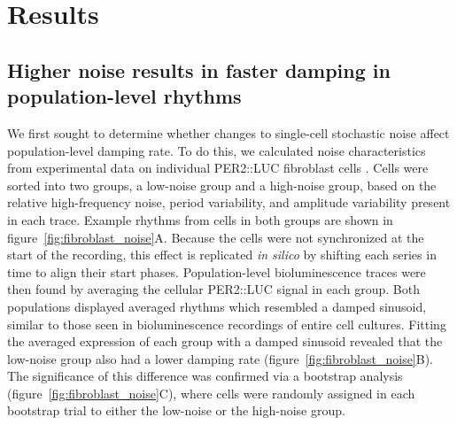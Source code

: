 \section{Results}

\subsection{Higher noise results in faster damping in population-level rhythms}

We first sought to determine whether changes to single-cell stochastic noise affect population-level damping rate.
To do this, we calculated noise characteristics from experimental data on individual PER2::LUC fibroblast cells \cite{Leise2012}.
Cells were sorted into two groups, a low-noise group and a high-noise group, based on the relative high-frequency noise, period variability, and amplitude variability present in each trace.
Example rhythms from cells in both groups are shown in figure~\ref{fig:fibroblast_noise}A.
Because the cells were not synchronized at the start of the recording, this effect is replicated {\itshape in silico} by shifting each series in time to align their start phases.
Population-level bioluminescence traces were then found by averaging the cellular PER2::LUC signal in each group.
Both populations displayed averaged rhythms which resembled a damped sinusoid, similar to those seen in bioluminescence recordings of entire cell cultures.
Fitting the averaged expression of each group with a damped sinusoid revealed that the low-noise group also had a lower damping rate (figure~\ref{fig:fibroblast_noise}B).
The significance of this difference was confirmed via a bootstrap analysis (figure~\ref{fig:fibroblast_noise}C), where cells were randomly assigned in each bootstrap trial to either the low-noise or the high-noise group.

